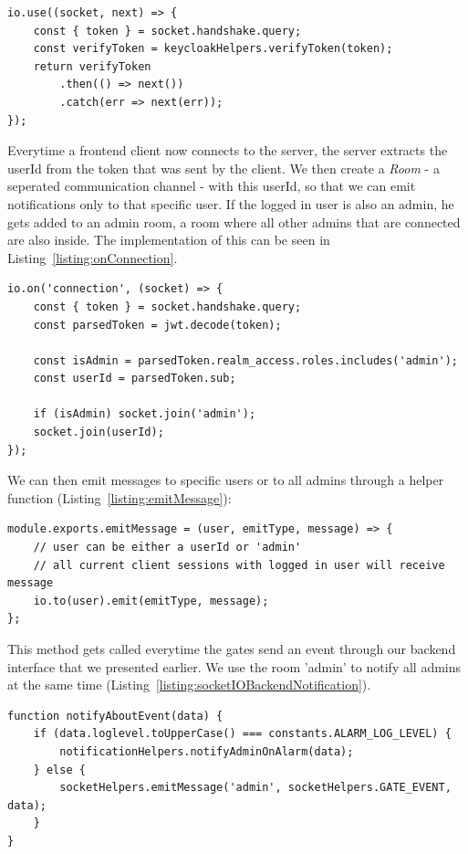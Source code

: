\begin{lstlisting}[label={listing:createSocketIOMiddleware},caption={Middleware of Socket.IO server}]
io.use((socket, next) => {
    const { token } = socket.handshake.query;
    const verifyToken = keycloakHelpers.verifyToken(token);
    return verifyToken
        .then(() => next())
        .catch(err => next(err));
});
\end{lstlisting}

Everytime a frontend client now connects to the server, the server extracts the userId from the token that was sent by the client. We then create a \emph{Room}\cite{socketio:rooms} - a seperated communication channel - with this userId, so that we can emit notifications only to that specific user. If the logged in user is also an admin, he gets added to an admin room, a room where all other admins that are connected are also inside. The implementation of this can be seen in Listing~\ref{listing:onConnection}.

\begin{lstlisting}[label={listing:onConnection},caption={Handling client connections to Socket.IO server}]
io.on('connection', (socket) => {
	const { token } = socket.handshake.query;
	const parsedToken = jwt.decode(token);

	const isAdmin = parsedToken.realm_access.roles.includes('admin');
	const userId = parsedToken.sub;

	if (isAdmin) socket.join('admin');
	socket.join(userId);
});
\end{lstlisting}

We can then emit messages to specific users or to all admins through a helper function (Listing~\ref{listing:emitMessage}):
\begin{lstlisting}[label={listing:emitMessage},caption={Helper function for emitting notifications}]
module.exports.emitMessage = (user, emitType, message) => {
	// user can be either a userId or 'admin'
	// all current client sessions with logged in user will receive message
	io.to(user).emit(emitType, message);
};
\end{lstlisting}

This method gets called everytime the gates send an event through our backend interface that we presented earlier. We use the room 'admin' to notify all admins at the same time (Listing~\ref{listing:socketIOBackendNotification}).

\begin{lstlisting}[label={listing:socketIOBackendNotification},caption={Emission of notification to all admins}]
function notifyAboutEvent(data) {
    if (data.loglevel.toUpperCase() === constants.ALARM_LOG_LEVEL) {
        notificationHelpers.notifyAdminOnAlarm(data);
    } else {
        socketHelpers.emitMessage('admin', socketHelpers.GATE_EVENT, data);
    }
}
\end{lstlisting}

